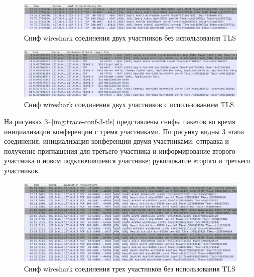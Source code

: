 \begin{figure}[h!]
  \centering
  \includegraphics[width=\linewidth]{inc/img/trace-conf-2.png}
  \caption{Сниф wireshark соединения двух участников без использования TLS}
  \label{img:trace-conf-2}
\end{figure}

\begin{figure}[h!]
  \centering
  \includegraphics[width=\linewidth]{inc/img/trace-conf-2-tls.png}
  \caption{Сниф wireshark соединения двух участников с использованием TLS}
  \label{img:trace-conf-2-tls}
\end{figure}

\clearpage

На рисунках \ref{img:trace-conf-3}--\ref{img:trace-conf-3-tls} представлены снифы пакетов во время инициализации конференции с тремя участниками. По рисунку видны 3 этапа соединения: инициализация конференции двумя участниками; отправка и получение приглашения для третьего участника и информирование второго участника о новом подключившемся участнике; рукопожатие второго и третьего участников.

\begin{figure}[h!]
  \centering
  \includegraphics[width=\linewidth]{inc/img/trace-conf-3.png}
  \caption{Сниф wireshark соединения трех участников без использования TLS}
  \label{img:trace-conf-3}
\end{figure}


